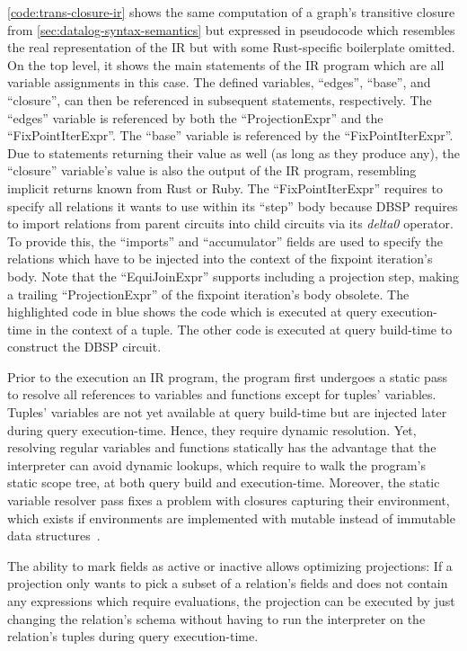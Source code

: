\ref{code:trans-closure-ir} shows the same computation of a graph's transitive
closure from \ref{sec:datalog-syntax-semantics} but expressed in pseudocode which
resembles the real representation of the \ac{IR} but with some Rust-specific
boilerplate omitted.
On the top level, it shows the main statements of the \ac{IR} program which
are all variable assignments in this case.
The defined variables, ``edges'', ``base'', and ``closure'', can then be referenced
in subsequent statements, respectively.
The ``edges'' variable is referenced by both the ``ProjectionExpr'' and the
``FixPointIterExpr''.
The ``base'' variable is referenced by the ``FixPointIterExpr''.
Due to statements returning their value as well (as long as they produce any),
the ``closure'' variable's value is also the output of the \ac{IR} program,
resembling implicit returns known from Rust or Ruby.
The ``FixPointIterExpr'' requires to specify all relations it wants to use within
its ``step'' body because DBSP requires to import relations from parent circuits
into child circuits via its \emph{delta0} operator.
To provide this, the ``imports'' and ``accumulator'' fields are used to
specify the relations which have to be injected into the context of the fixpoint
iteration's body.
Note that the ``EquiJoinExpr'' supports including a projection step,
making a trailing ``ProjectionExpr'' of the fixpoint iteration's body obsolete.
The highlighted code in blue shows the code which is executed at query
execution-time in the context of a tuple.
The other code is executed at query build-time to construct the DBSP circuit.

Prior to the execution an \ac{IR} program, the program first undergoes a
static pass to resolve all references to variables and functions except for
tuples' variables.
Tuples' variables are not yet available at query build-time but are injected
later during query execution-time. Hence, they require dynamic resolution.
Yet, resolving regular variables and functions statically has the advantage that
the interpreter can avoid dynamic lookups, which require to walk the program's
static scope tree, at both query build and execution-time.
Moreover, the static variable resolver pass fixes a problem with closures
capturing their environment, which exists if environments are implemented with
mutable instead of immutable data structures~\cite{nystrom2021crafting}.

The ability to mark fields as active or inactive allows optimizing projections:
If a projection only wants to pick a subset of a relation's fields and does not
contain any expressions which require evaluations, the projection can be executed
by just changing the relation's schema without having to run the interpreter
on the relation's tuples during query execution-time.


